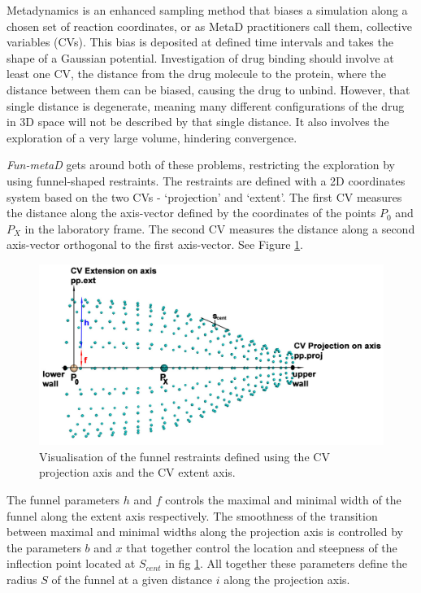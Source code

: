 Metadynamics is an enhanced sampling method that biases a simulation
along a chosen set of reaction coordinates, or as MetaD practitioners
call them, collective variables (CVs). This bias is deposited at defined
time intervals and takes the shape of a Gaussian potential.
Investigation of drug binding should involve at least one CV, the distance
from the drug molecule to the protein, where the distance between them
can be biased, causing the drug to unbind. However, that single distance
is degenerate, meaning many different configurations of the drug in 3D
space will not be described by that single distance. It also involves
the exploration of a very large volume, hindering convergence.

\emph{Fun-metaD} gets around both of these problems, restricting the
exploration by using funnel-shaped restraints. The restraints are defined with a 2D coordinates system based on the  two CVs - `projection' and `extent'. The first CV measures the distance along the axis-vector defined by the coordinates of the points $P_{0}$ and $P_{X}$ in the laboratory frame. The second CV measures the distance along a second axis-vector orthogonal to the first axis-vector. See Figure \ref{fig:funnel}. 

\begin{figure}[htp]
\includegraphics[width=\linewidth]{LIVECOMS/02_funnel_metad/funmetadfig1.jpeg}
\caption{Visualisation of the funnel restraints defined using the CV projection axis and the CV extent axis.}
\label{fig:funnel}
\end{figure}

The funnel parameters $h$ and $f$ controls the maximal and minimal width of the funnel along the extent axis respectively. The smoothness of the transition between maximal and minimal widths along the projection axis is controlled by the parameters $b$ and $x$ that together control the location and steepness of the inflection point located at $S_{cent}$ in fig \ref{fig:funnel}.  All together these parameters define the radius $S$ of the funnel at a given distance $i$ along the projection axis.  

